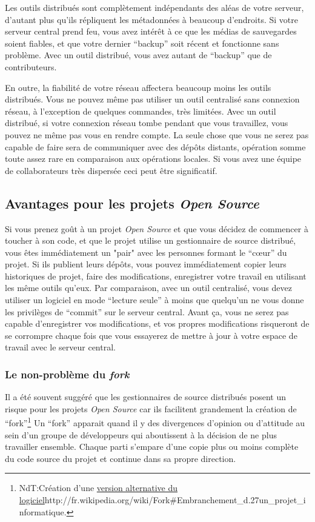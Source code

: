 Les outils distribués sont complètement indépendants des aléas de votre serveur,
d'autant plus qu'ils répliquent les métadonnées à beaucoup d'endroits. Si
votre serveur central prend feu, vous avez intérêt à ce que les médias de 
sauvegardes soient fiables, et que votre dernier ``backup'' soit récent et
fonctionne sans problème. Avec un outil distribué, vous avez autant de 
``backup'' que de contributeurs.

En outre, la fiabilité de votre réseau affectera beaucoup moins les
outils distribués. Vous ne pouvez même pas utiliser un outil centralisé
sans connexion réseau, à l'exception de quelques commandes, très limitées. 
Avec un outil distribué, si votre connexion réseau tombe pendant que vous
travaillez, vous pouvez ne même pas vous en rendre compte. La seule chose
que vous ne serez pas capable de faire sera de communiquer avec des dépôts
distants, opération somme toute assez rare en comparaison aux opérations
locales. Si vous avez une équipe de collaborateurs très dispersée ceci peut
être significatif.

\subsection{Avantages pour les projets \textit{Open Source}}

Si vous prenez goût à un projet \textit{Open Source} et que vous
décidez de commencer à toucher à son code, et que le projet utilise
un gestionnaire de source distribué, vous êtes immédiatement un "pair"
avec les personnes formant le ``cœur'' du projet. Si ils publient
leurs dépôts, vous pouvez immédiatement copier leurs historiques de
projet, faire des modifications, enregistrer votre travail en utilisant
les même outils qu'eux. Par comparaison, avec un outil centralisé, vous
devez utiliser un logiciel en mode ``lecture seule'' à moins que 
quelqu'un ne vous donne les privilèges de ``commit'' sur le serveur
central. Avant ça, vous ne serez pas capable d'enregistrer vos 
modifications, et vos propres modifications risqueront de se 
corrompre chaque fois que vous essayerez de mettre à jour à votre
espace de travail avec le serveur central.

\subsubsection{Le non-problème du \textit{fork}}

Il a été souvent suggéré que les gestionnaires de source distribués
posent un risque pour les projets \textit{Open Source} car ils 
facilitent grandement la création de ``fork''\footnote{NdT:Création 
d'une 
\url{version alternative du logiciel}{http://fr.wikipedia.org/wiki/Fork\#Embranchement\_d.27un\_projet\_informatique}.}
Un ``fork'' apparait quand il y des divergences d'opinion ou d'attitude
au sein d'un groupe de développeurs qui aboutissent à la décision de ne 
plus travailler ensemble. Chaque parti s'empare d'une copie plus ou moins
complète du code source du projet et continue dans sa propre direction.

